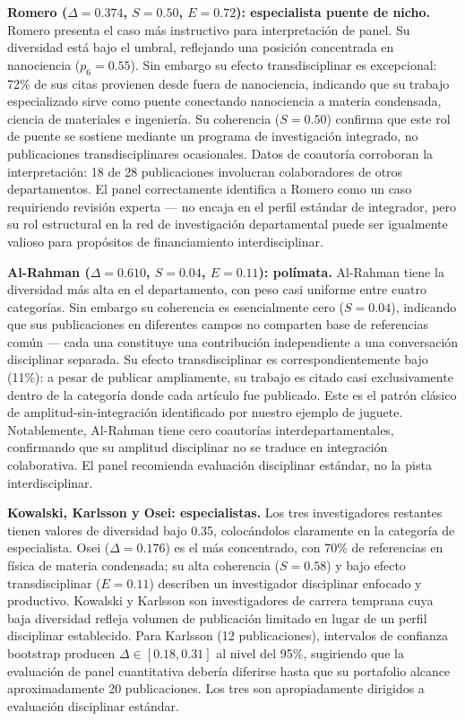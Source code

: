 \documentclass[
]{article}
\begin{document}
\textbf{Romero (\(\Delta = 0.374\), \(S = 0.50\), \(E = 0.72\)):
especialista puente de nicho.} Romero presenta el caso más instructivo
para interpretación de panel. Su diversidad está bajo el umbral,
reflejando una posición concentrada en nanociencia (\(p_6 = 0.55\)). Sin
embargo su efecto transdisciplinar es excepcional: 72\% de sus citas
provienen desde fuera de nanociencia, indicando que su trabajo
especializado sirve como puente conectando nanociencia a materia
condensada, ciencia de materiales e ingeniería. Su coherencia
(\(S = 0.50\)) confirma que este rol de puente se sostiene mediante un
programa de investigación integrado, no publicaciones transdisciplinares
ocasionales. Datos de coautoría corroboran la interpretación: 18 de 28
publicaciones involucran colaboradores de otros departamentos. El panel
correctamente identifica a Romero como un caso requiriendo revisión
experta --- no encaja en el perfil estándar de integrador, pero su rol
estructural en la red de investigación departamental puede ser
igualmente valioso para propósitos de financiamiento interdisciplinar.

\textbf{Al-Rahman (\(\Delta = 0.610\), \(S = 0.04\), \(E = 0.11\)):
polímata.} Al-Rahman tiene la diversidad más alta en el departamento,
con peso casi uniforme entre cuatro categorías. Sin embargo su
coherencia es esencialmente cero (\(S = 0.04\)), indicando que sus
publicaciones en diferentes campos no comparten base de referencias
común --- cada una constituye una contribución independiente a una
conversación disciplinar separada. Su efecto transdisciplinar es
correspondientemente bajo (11\%): a pesar de publicar ampliamente, su
trabajo es citado casi exclusivamente dentro de la categoría donde cada
artículo fue publicado. Este es el patrón clásico de
amplitud-sin-integración identificado por nuestro ejemplo de juguete.
Notablemente, Al-Rahman tiene cero coautorías interdepartamentales,
confirmando que su amplitud disciplinar no se traduce en integración
colaborativa. El panel recomienda evaluación disciplinar estándar, no la
pista interdisciplinar.

\textbf{Kowalski, Karlsson y Osei: especialistas.} Los tres
investigadores restantes tienen valores de diversidad bajo 0.35,
colocándolos claramente en la categoría de especialista. Osei
(\(\Delta = 0.176\)) es el más concentrado, con 70\% de referencias en
física de materia condensada; su alta coherencia (\(S = 0.58\)) y bajo
efecto transdisciplinar (\(E = 0.11\)) describen un investigador
disciplinar enfocado y productivo. Kowalski y Karlsson son
investigadores de carrera temprana cuya baja diversidad refleja volumen
de publicación limitado en lugar de un perfil disciplinar establecido.
Para Karlsson (12 publicaciones), intervalos de confianza bootstrap
producen \(\Delta \in [0.18, 0.31]\) al nivel del 95\%, sugiriendo que
la evaluación de panel cuantitativa debería diferirse hasta que su
portafolio alcance aproximadamente 20 publicaciones. Los tres son
apropiadamente dirigidos a evaluación disciplinar estándar.
\end{document}
